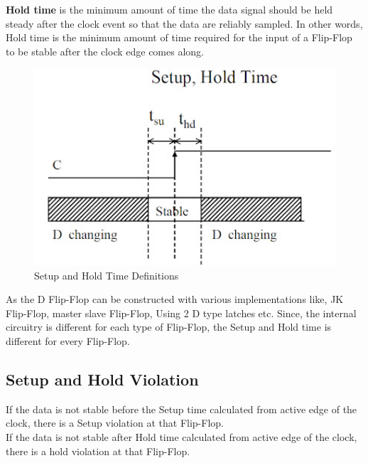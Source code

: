 \textbf{Hold time} is the minimum amount of time the data signal should be held steady after the clock event so that the data are reliably sampled. In other words, Hold time is the minimum amount of time required for the input of a Flip-Flop to be stable after the clock edge comes along.\\  

\begin{figure}[H]
\begin{center}
\includegraphics[width=4.5in]{images/STASetupHold2.jpg}
\caption{Setup and Hold Time Definitions}
\label{STASetupHold2}
\end{center}
\end{figure}

As the D Flip-Flop can be constructed with various implementations like, JK Flip-Flop, master slave Flip-Flop, Using 2 D type latches etc. Since, the internal circuitry is different for each type of Flip-Flop, the Setup and Hold time is different for every Flip-Flop.

\subsection{Setup and Hold Violation}
If the data is not stable before the Setup time calculated from active edge of the clock, there is a Setup violation at that Flip-Flop.\\ 
If the data is not stable after Hold time calculated from active edge of the clock, there is a hold violation at that Flip-Flop.


